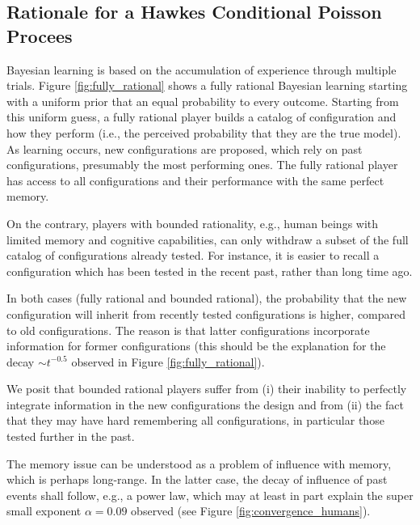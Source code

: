 \documentclass{article}
\begin{document}
  

\subsection*{Rationale for a Hawkes Conditional Poisson Procees}
Bayesian learning is based on the accumulation of experience through multiple trials. Figure \ref{fig:fully_rational} shows a fully rational Bayesian learning starting with a uniform prior that an equal probability to every outcome. Starting from this uniform guess, a fully rational player builds a catalog of configuration and how they perform (i.e., the perceived probability that they are the true model). As learning occurs, new configurations are proposed, which rely on past configurations, presumably the most performing ones. The fully rational player has access to all configurations and their performance with the same perfect memory. 

On the contrary, players with bounded rationality, e.g., human beings with limited memory and cognitive capabilities, can only withdraw a subset of the full catalog of configurations already tested. For instance, it is easier to recall a configuration which has been tested in the recent past, rather than long time ago.

In both cases (fully rational and bounded rational), the probability that the new configuration will inherit from recently tested configurations is higher, compared to old configurations. The reason is that latter configurations incorporate information for former configurations (this should be the explanation for the decay $\sim t^{-0.5}$ observed in Figure \ref{fig:fully_rational}). 

We posit that bounded rational players suffer from (i) their inability to perfectly integrate information in the new configurations the design and from (ii) the fact that they may have hard remembering all configurations, in particular those tested further in the past.

The memory issue can be understood as a problem of influence with memory, which is perhaps long-range. In the latter case, the decay of influence of past events shall follow, e.g., a power law, which may at least in part explain the super small exponent $\alpha = 0.09$ observed (see Figure \ref{fig:convergence_humans}).
\end{document}
